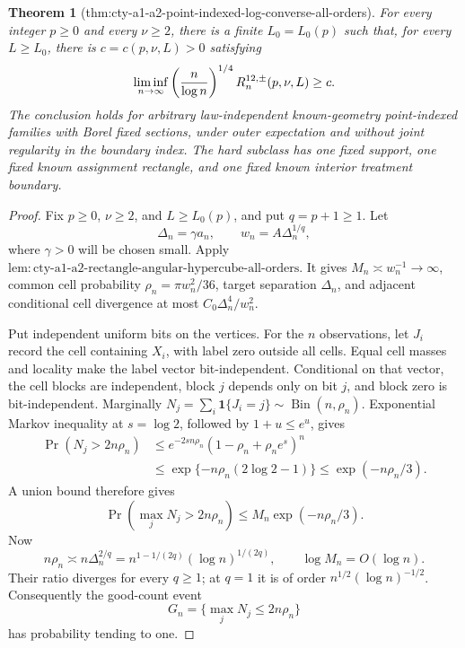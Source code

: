 \documentclass{article}
\newtheorem{theorem}{Theorem}
\begin{document}
\begin{theorem}[thm:cty-a1-a2-point-indexed-log-converse-all-orders]\label{thm:cty-a1-a2-point-indexed-log-converse-all-orders}
For every integer \(p\geq0\) and every \(\nu\geq2\), there is a finite \(L_0=L_0(p)\) such that, for every \(L\geq L_0\), there is \(c=c(p,\nu,L)>0\) satisfying
\[
 \liminf_{n\to\infty}\left({n\over\log n}\right)^{1/4}R^{12,\pm}_n(p,\nu,L)\geq c.
\]
The conclusion holds for arbitrary law-independent known-geometry point-indexed families with Borel fixed sections, under outer expectation and without joint regularity in the boundary index.  The hard subclass has one fixed support, one fixed known assignment rectangle, and one fixed known interior treatment boundary.
\end{theorem}
\begin{proof}
Fix \(p\geq0\), \(\nu\geq2\), and \(L\geq L_0(p)\), and put \(q=p+1\geq1\).  Let
\[
 \Delta_n=\gamma a_n,
 \qquad w_n=A\Delta_n^{1/q},
\]
where \(\gamma>0\) will be chosen small.  Apply \(\mathrm{lem:cty\text{-}a1\text{-}a2\text{-}rectangle\text{-}angular\text{-}hypercube\text{-}all\text{-}orders}\).  It gives \(M_n\asymp w_n^{-1}\to\infty\), common cell probability \(\rho_n=\pi w_n^2/36\), target separation \(\Delta_n\), and adjacent conditional cell divergence at most \(C_0\Delta_n^4/w_n^2\).

Put independent uniform bits on the vertices.  For the \(n\) observations, let \(J_i\) record the cell containing \(X_i\), with label zero outside all cells.  Equal cell masses and locality make the label vector bit-independent.  Conditional on that vector, the cell blocks are independent, block \(j\) depends only on bit \(j\), and block zero is bit-independent.  Marginally \(N_j=\sum_i\mathbf1\{J_i=j\}\sim\operatorname{Bin}(n,\rho_n)\).  Exponential Markov inequality at \(s=\log2\), followed by \(1+u\leq e^u\), gives
\[
\begin{split}
 \Pr(N_j>2n\rho_n)
 &\leq e^{-2sn\rho_n}(1-\rho_n+\rho_ne^s)^n\\
 &\leq\exp\{-n\rho_n(2\log2-1)\}
 \leq\exp(-n\rho_n/3).
\end{split}
\]
A union bound therefore gives
\[
 \Pr\!\left(\max_jN_j>2n\rho_n\right)
 \leq M_n\exp(-n\rho_n/3).
\]
Now
\[
 n\rho_n\asymp n\Delta_n^{2/q}
 =n^{1-1/(2q)}(\log n)^{1/(2q)},
 \qquad \log M_n=O(\log n).
\]
Their ratio diverges for every \(q\geq1\); at \(q=1\) it is of order \(n^{1/2}(\log n)^{-1/2}\).  Consequently the good-count event
\[
 G_n=\{\max_jN_j\leq2n\rho_n\}
\]
has probability tending to one.


\end{proof}
\end{document}
